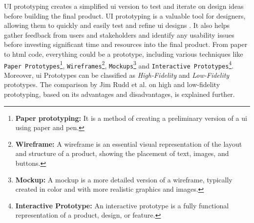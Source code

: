 UI prototyping creates a simplified \ac{ui} version to test and iterate on design ideas before building the final product.
UI prototyping is a valuable tool for designers, allowing them to quickly and easily test and refine \ac{ui} designs \cite{article:prototyping:gould}.
It also helps gather feedback from users and stakeholders \cite{misc:prorotypes:lauff} and identify any usability issues before investing significant time and resources into the final product.
From paper to \ac{html} code, everything could be a prototype, including various techniques like \texttt{Paper Prototypes}\footnote{\textbf{Paper prototyping:} It is a method of creating a preliminary version of a \ac{ui} using paper and pen.}, \texttt{Wireframes}\footnote{\textbf{Wireframe:} A wireframe is an essential visual representation of the layout and structure of a product, showing the placement of text, images, and buttons.}, \texttt{Mockups}\footnote{\textbf{Mockup:} A mockup is a more detailed version of a wireframe, typically created in color and with more realistic graphics and images.} and \texttt{Interactive Prototypes}\footnote{\textbf{Interactive Prototype:} An interactive prototype is a fully functional representation of a product, design, or feature.}.
Moreover, \ac{ui} Prototypes can be classified as \textit{High-Fidelity} and \textit{Low-Fidelity} prototypes.
The comparison by Jim Rudd et al. \cite{article:prototyping:highlowfidelity} on high and low-fidelity prototyping, based on its advantages and disadvantages, is explained further.

